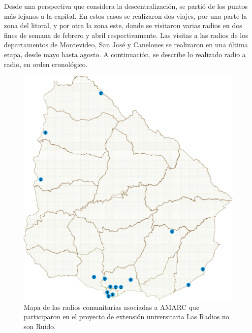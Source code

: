 Desde una perspectiva que considera la descentralización, se partió de los puntos más lejanos a la capital. En estos casos se realizaron dos viajes, por una parte la zona del litoral, y por otra la zona este, donde se visitaron varias radios en dos fines de semana de febrero y abril respectivamente. Las visitas a las radios de los departamentos de Montevideo, San José y Canelones se realizaron en una última etapa, desde mayo hasta agosto. A continuación, se describe lo realizado radio a radio, en orden cronológico.\\
\begin{figure}[htpb]
 \centering
 \includegraphics[scale=0.6]{./Cap/imestaud/MapaTotal.png}
 \caption{Mapa de las radios comunitarias asociadas a AMARC que participaron en el proyecto de extensión universitaria Las Radios no son Ruido.}
 \label{MapaTotal}
\end{figure}

